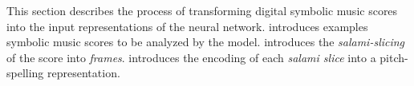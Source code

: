 

This section describes the process of transforming digital symbolic music scores into the input representations of the neural network.  introduces examples symbolic music scores to be analyzed by the model.  introduces the \emph{salami-slicing} of the score into \emph{frames}.  introduces the encoding of each \emph{salami slice} into a \gls{pitch-spelling} representation.
